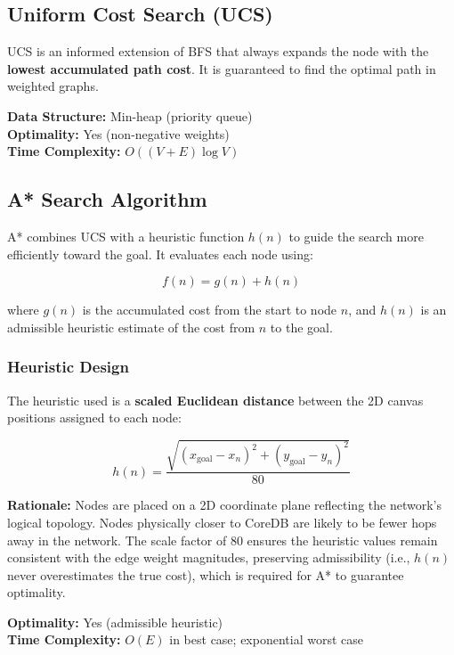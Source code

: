 \documentclass[12pt,a4paper]{article}
\begin{document}
\subsection{Uniform Cost Search (UCS)}

UCS is an informed extension of BFS that always expands the node with the
\textbf{lowest accumulated path cost}. It is guaranteed to find the optimal path in
weighted graphs.

\textbf{Data Structure:} Min-heap (priority queue)\\
\textbf{Optimality:} Yes (non-negative weights)\\
\textbf{Time Complexity:} $O((V + E) \log V)$

\subsection{A* Search Algorithm}

A* combines UCS with a heuristic function $h(n)$ to guide the search more efficiently
toward the goal. It evaluates each node using:

\begin{equation}
    f(n) = g(n) + h(n)
\end{equation}

where $g(n)$ is the accumulated cost from the start to node $n$, and $h(n)$ is an
admissible heuristic estimate of the cost from $n$ to the goal.

\subsubsection{Heuristic Design}

The heuristic used is a \textbf{scaled Euclidean distance} between the 2D canvas
positions assigned to each node:

\begin{equation}
    h(n) = \frac{\sqrt{(x_{\text{goal}} - x_n)^2 + (y_{\text{goal}} - y_n)^2}}{80}
\end{equation}

\textbf{Rationale:} Nodes are placed on a 2D coordinate plane reflecting the
network's logical topology. Nodes physically closer to CoreDB are likely to be fewer
hops away in the network. The scale factor of 80 ensures the heuristic values remain
consistent with the edge weight magnitudes, preserving admissibility (i.e., $h(n)$
never overestimates the true cost), which is required for A* to guarantee optimality.

\textbf{Optimality:} Yes (admissible heuristic)\\
\textbf{Time Complexity:} $O(E)$ in best case; exponential worst case
\end{document}
